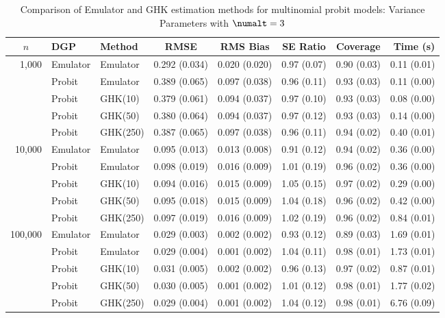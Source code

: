 \begin{table}[htbp]
\centering
\footnotesize
\begin{tabular}{@{}rllrrrrr@{}}
\toprule
\multicolumn{1}{c}{$n$} & \multicolumn{1}{l}{DGP} & \multicolumn{1}{l}{Method} & \multicolumn{1}{c}{RMSE} & \multicolumn{1}{c}{RMS Bias} & \multicolumn{1}{c}{SE Ratio} & \multicolumn{1}{c}{Coverage} & \multicolumn{1}{r}{Time (s)} \\
\midrule
\multirow{5}{*}{1,000} & Emulator & Emulator & 0.292 (0.034) & 0.020 (0.020) & 0.97 (0.07) & 0.90 (0.03) & 0.11 (0.01) \\
 & Probit & Emulator & 0.389 (0.065) & 0.097 (0.038) & 0.96 (0.11) & 0.93 (0.03) & 0.11 (0.00) \\
 & Probit & GHK(10) & 0.379 (0.061) & 0.094 (0.037) & 0.97 (0.10) & 0.93 (0.03) & 0.08 (0.00) \\
 & Probit & GHK(50) & 0.380 (0.064) & 0.094 (0.037) & 0.97 (0.12) & 0.93 (0.03) & 0.14 (0.00) \\
 & Probit & GHK(250) & 0.387 (0.065) & 0.097 (0.038) & 0.96 (0.11) & 0.94 (0.02) & 0.40 (0.01) \\
\midrule
\multirow{5}{*}{10,000} & Emulator & Emulator & 0.095 (0.013) & 0.013 (0.008) & 0.91 (0.12) & 0.94 (0.02) & 0.36 (0.00) \\
 & Probit & Emulator & 0.098 (0.019) & 0.016 (0.009) & 1.01 (0.19) & 0.96 (0.02) & 0.36 (0.00) \\
 & Probit & GHK(10) & 0.094 (0.016) & 0.015 (0.009) & 1.05 (0.15) & 0.97 (0.02) & 0.29 (0.00) \\
 & Probit & GHK(50) & 0.095 (0.018) & 0.015 (0.009) & 1.04 (0.18) & 0.96 (0.02) & 0.42 (0.00) \\
 & Probit & GHK(250) & 0.097 (0.019) & 0.016 (0.009) & 1.02 (0.19) & 0.96 (0.02) & 0.84 (0.01) \\
\midrule
\multirow{5}{*}{100,000} & Emulator & Emulator & 0.029 (0.003) & 0.002 (0.002) & 0.93 (0.12) & 0.89 (0.03) & 1.69 (0.01) \\
 & Probit & Emulator & 0.029 (0.004) & 0.001 (0.002) & 1.04 (0.11) & 0.98 (0.01) & 1.73 (0.01) \\
 & Probit & GHK(10) & 0.031 (0.005) & 0.002 (0.002) & 0.96 (0.13) & 0.97 (0.02) & 0.87 (0.01) \\
 & Probit & GHK(50) & 0.030 (0.005) & 0.001 (0.002) & 1.01 (0.12) & 0.98 (0.01) & 1.77 (0.02) \\
 & Probit & GHK(250) & 0.029 (0.004) & 0.001 (0.002) & 1.04 (0.12) & 0.98 (0.01) & 6.76 (0.09) \\
\bottomrule
\end{tabular}
\caption{Comparison of Emulator and GHK estimation methods for multinomial probit models: Variance Parameters with $\numalt=3$}
\label{tab:emulator_vs_ghk:3:variance}
\end{table}